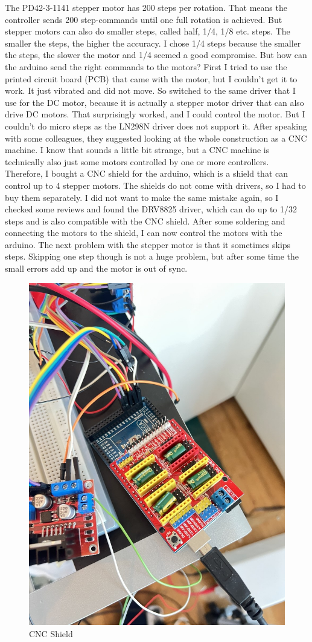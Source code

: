 The PD42-3-1141 stepper motor has 200 steps per rotation.
That means the controller sends 200 step-commands until one full rotation is achieved.
But stepper motors can also do smaller steps, called half, 1/4, 1/8 etc. steps.
The smaller the steps, the higher the accuracy.
I chose 1/4 steps because the smaller the steps, the slower the motor and 1/4 seemed a good compromise.
But how can the arduino send the right commands to the motors?
First I tried to use the printed circuit board (PCB) that came with the motor, but I couldn't get it to work.
It just vibrated and did not move.
So switched to the same driver that I use for the DC motor, because it is actually a stepper motor driver that can also drive DC motors.
That surprisingly worked, and I could control the motor.
But I couldn't do micro steps as the LN298N driver does not support it.
After speaking with some colleagues, they suggested looking at the whole construction as a CNC machine.
I know that sounds a little bit strange, but a CNC machine is technically also just some motors controlled by one or more controllers.
Therefore, I bought a CNC shield\autocite{cnc-shield} for the arduino, which is a shield that can control up to 4 stepper motors.
The shields do not come with drivers, so I had to buy them separately.
I did not want to make the same mistake again, so I checked some reviews and found the DRV8825\autocite{drv8825} driver, which can do up to 1/32 steps and is also compatible with the CNC shield.
After some soldering and connecting the motors to the shield, I can now control the motors with the arduino.
The next problem with the stepper motor is that it sometimes skips steps.
Skipping one step though is not a huge problem, but after some time the small errors add up and the motor is out of sync.
\begin{figure}[H]
    \centering
    \includegraphics[width=.3\linewidth]{../photos/cnc_shield}
    \caption{CNC Shield}
    \label{fig:cnc_shield}
\end{figure}

